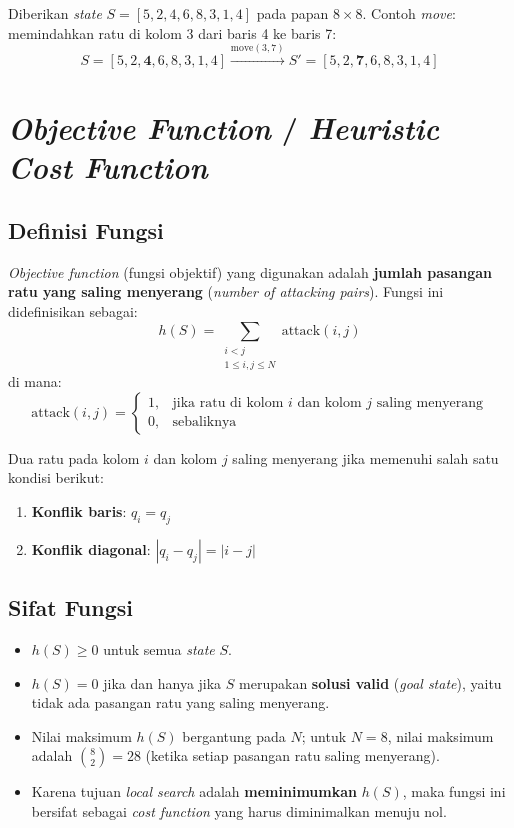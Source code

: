 \documentclass[12pt,a4paper]{article}
\begin{document}
Diberikan \textit{state} $S = [5, 2, 4, 6, 8, 3, 1, 4]$ pada papan $8 \times 8$. Contoh \textit{move}: memindahkan ratu di kolom 3 dari baris 4 ke baris 7:
\[
    S = [5, 2, \mathbf{4}, 6, 8, 3, 1, 4] \xrightarrow{\text{move}(3, 7)} S' = [5, 2, \mathbf{7}, 6, 8, 3, 1, 4]
\]

\section{\textit{Objective Function} / \textit{Heuristic Cost Function}}
\label{sec:objective}

\subsection{Definisi Fungsi}
\label{subsec:def-objective}

\textit{Objective function} (fungsi objektif) yang digunakan adalah \textbf{jumlah pasangan ratu yang saling menyerang} (\textit{number of attacking pairs}). Fungsi ini didefinisikan sebagai:
\[
    h(S) = \sum_{\substack{i < j \\ 1 \leq i,j \leq N}} \text{attack}(i, j)
\]
di mana:
\[
    \text{attack}(i, j) =
    \begin{cases}
        1, & \text{jika ratu di kolom } i \text{ dan kolom } j \text{ saling menyerang} \\
        0, & \text{sebaliknya}
    \end{cases}
\]

Dua ratu pada kolom $i$ dan kolom $j$ saling menyerang jika memenuhi salah satu kondisi berikut:
\begin{enumerate}[label=(\alph*)]
    \item \textbf{Konflik baris}: $q_i = q_j$
    \item \textbf{Konflik diagonal}: $|q_i - q_j| = |i - j|$
\end{enumerate}

\subsection{Sifat Fungsi}
\label{subsec:sifat-objective}

\begin{itemize}
    \item $h(S) \geq 0$ untuk semua \textit{state} $S$.
    \item $h(S) = 0$ jika dan hanya jika $S$ merupakan \textbf{solusi valid} (\textit{goal state}), yaitu tidak ada pasangan ratu yang saling menyerang.
    \item Nilai maksimum $h(S)$ bergantung pada $N$; untuk $N = 8$, nilai maksimum adalah $\binom{8}{2} = 28$ (ketika setiap pasangan ratu saling menyerang).
    \item Karena tujuan \textit{local search} adalah \textbf{meminimumkan} $h(S)$, maka fungsi ini bersifat sebagai \textit{cost function} yang harus diminimalkan menuju nol.
\end{itemize}
\end{document}
